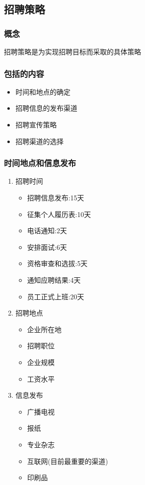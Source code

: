 \documentclass{ctexart}
\begin{document}
\subsection{招聘策略}
\label{sec-2-2}
\subsubsection{概念}
\label{sec-2-2-1}
招聘策略是为实现招聘目标而采取的具体策略
\subsubsection{包括的内容}
\label{sec-2-2-2}
\begin{itemize}
\item 时间和地点的确定
\item 招聘信息的发布渠道
\item 招聘宣传策略
\item 招聘渠道的选择
\end{itemize}
\subsubsection{时间地点和信息发布}
\label{sec-2-2-3}
\begin{enumerate}
\item 招聘时间
\label{sec-2-2-3-1}
\begin{itemize}
\item 招聘信息发布:15天
\item 征集个人履历表:10天
\item 电话通知:2天
\item 安排面试:6天
\item 资格审查和选拔:5天
\item 通知应聘结果:4天
\item 员工正式上班:20天
\end{itemize}
\item 招聘地点
\label{sec-2-2-3-2}
\begin{itemize}
\item 企业所在地
\item 招聘职位
\item 企业规模
\item 工资水平
\end{itemize}
\item 信息发布
\label{sec-2-2-3-3}
\begin{itemize}
\item 广播电视
\item 报纸
\item 专业杂志
\item 互联网(目前最重要的渠道)
\item 印刷品
\end{itemize}
\end{enumerate}
\end{document}
